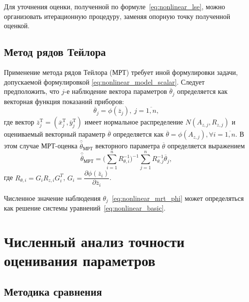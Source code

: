 Для уточнения оценки, полученной по формуле~\eqref{eq:nonlinear_lse}, можно
организовать итерационную процедуру, заменяя опорную точку полученной оценкой.

\vspace{2\baselineskip}
\subsection{Метод рядов Тейлора}

Применение метода рядов Тейлора (МРТ) требует иной формулировки задачи,
допускаемой формулировкой \eqref{eq:nonlinear_model_scalar}.
Следует предположить, что \( j \)-е наблюдение вектора параметров \( \overline{\theta}_j \)
определяется как векторная функция показаний приборов:
\begin{equation}
  \label{eq:nonlinear_mrt_phi}
  \overline{\theta}_j = \phi( \overline{z}_{j} ), \: j = \overline{1, n},
\end{equation}
где вектор
\( \overline{z}^{\text{T}}_{j} =
( \overline{x}^{\text{T}}_{j}, \overline{y}^{\text{T}}_{j}) \)
имеет нормальное распределение \( N(A_{z,j}, R_{z,j}) \)
и оцениваемый векторный параметр \( \overline{\theta} \) определяется как
\( \overline{\theta} = \phi(A_{z,j}), \forall i = \overline{1, n} \).
В этом случае МРТ-оценка \( \hat{\overline{\theta}}_{\text{МРТ}} \) векторного параметра \( \overline{\theta} \)
определяется выражением
\begin{equation}
  \label{eq:nonlinear_mrt}
  \hat{\overline{\theta}}_{\text{МРТ}} =
  \Bigg( \sum^{n}_{i=1} R^{-1}_{\theta,i} \Bigg)^{-1}
  \sum^{n}_{j=1} R^{-1}_{\theta,j} \overline{\theta}_j,
\end{equation}
где
\( R_{\theta,i} = G_i R_{z,i} G^T_i \),
\( G_i =
\dfrac{\partial \phi( \overline{z}_{i} ) }{ \partial \overline{z}_{i} } \).

Численное значение наблюдения \( \theta_j \)~\eqref{eq:nonlinear_mrt_phi} может определяться как
решение системы уравнений~\eqref{eq:nonlinear_basic}.


\section{Численный анализ точности оценивания параметров}

\subsection{Методика сравнения}\label{subsec:nonlinear_comparison_conditions}

